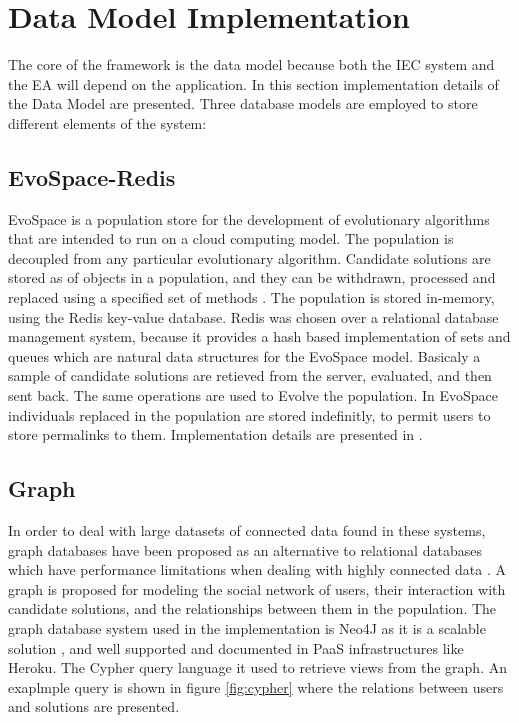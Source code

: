 \section{Data Model Implementation}
\label{sec:implementation}

The core of the framework is the data model because both the IEC system and the EA will 
depend on the application. In this section implementation details of the Data Model are presented.
Three database models are employed to store different elements of the system: 

  \subsection{EvoSpace-Redis}
EvoSpace is a population store \cite{Evospace}  for the development of 
evolutionary algorithms that are intended to run on a cloud computing model. 
The population is decoupled from any particular evolutionary algorithm. 
Candidate solutions are stored as of objects in a population, and they can be withdrawn, 
processed and replaced using a specified set of methods \cite{GValdez2015}. The population
is stored in-memory, using the Redis key-value database. Redis was chosen over a relational 
database management system, because it provides a hash based implementation of sets and 
queues which are natural data structures for the EvoSpace model. Basicaly a sample of 
candidate solutions are retieved from the server, evaluated, and then sent back. 
The same operations are used to Evolve the population. In EvoSpace individuals replaced 
in the population are stored indefinitly, to permit users to store permalinks to them.
Implementation details are presented in \cite{garcia2013evospace}.

\subsection{Graph}
  In order to deal with large datasets of connected data found in these systems,
  graph databases \cite{angles2012comparison} have been proposed as an alternative to relational databases 
  which have performance limitations when dealing with highly connected data \cite{holzschuher2013performance}.
  A graph is proposed for modeling the social network of users, their interaction with 
  candidate solutions, and the relationships between them in the population.
  The graph database system used in the implementation is Neo4J as it is
  a scalable solution \cite{miller2013graph,holzschuher2013performance}, and well supported and documented
  in PaaS infrastructures like Heroku. The Cypher query language it used to retrieve views from the graph.
  An exaplmple query is shown in figure \ref{fig:cypher} where the relations between users and solutions 
  are presented.
  
